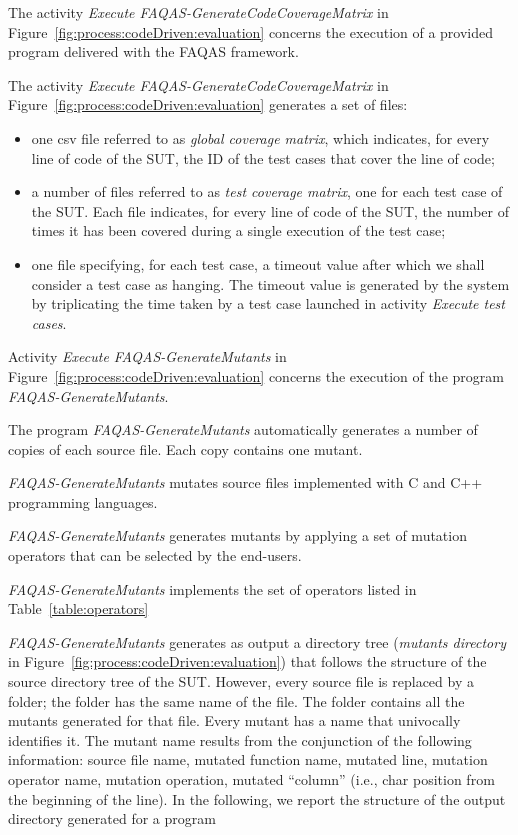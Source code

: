 \RQ{} The activity \emph{Execute FAQAS-GenerateCodeCoverageMatrix} in Figure~\ref{fig:process:codeDriven:evaluation} concerns the execution of a provided program delivered with the FAQAS framework.

\RQ{} The activity \emph{Execute FAQAS-GenerateCodeCoverageMatrix} in Figure~\ref{fig:process:codeDriven:evaluation} generates a set of files: 
\begin{itemize}
\item one csv file referred to as \emph{global coverage matrix}, which indicates, for every line of code of the SUT, the ID of the test cases that cover the line of code;
\item a number of files  referred to as \emph{test coverage matrix}, one for each test case of the SUT. Each file indicates, for every line of code of the SUT, the number of times it has been covered during a single execution of the test case;
\item one file specifying, for each test case, a timeout value after which we shall consider a test case as hanging. The timeout value is generated by the system by triplicating the time taken by a test case launched in activity \emph{Execute test cases}.
\end{itemize}



\RQ{} Activity \emph{Execute FAQAS-GenerateMutants} in Figure~\ref{fig:process:codeDriven:evaluation} concerns the execution of the program \emph{FAQAS-GenerateMutants}. 

\RQ{} The program \emph{FAQAS-GenerateMutants} automatically generates a number of copies of each source file. Each copy contains one mutant.

\RQ{} \emph{FAQAS-GenerateMutants} mutates source files implemented with C and C++ programming languages.

\RQ{} \emph{FAQAS-GenerateMutants} generates mutants by applying a set of mutation operators that can be selected by the end-users.

\RQ{} \emph{FAQAS-GenerateMutants} implements the set of operators listed in Table~\ref{table:operators}




\RQ{} \emph{FAQAS-GenerateMutants} generates as output a directory tree (\emph{mutants directory} in Figure~\ref{fig:process:codeDriven:evaluation}) that follows the structure of the source directory tree of the SUT. However, every source file is replaced by a folder; the folder has the same name of the file. The folder contains all the mutants generated for that file. Every mutant has a name that univocally identifies it. The mutant name results from the conjunction of the following information:
source file name, mutated function name, mutated line, mutation operator name, mutation operation, mutated “column” (i.e., char position from the beginning of the line).
In the following, we report the structure of the output directory generated for a program

